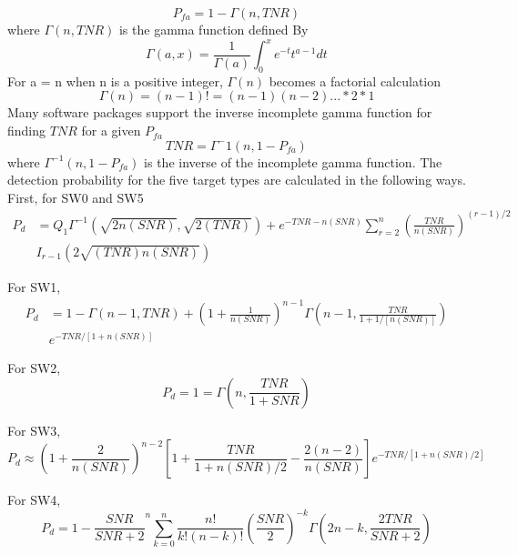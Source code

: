 \documentclass[12pt]{article}
\begin{document}
\begin{equation}
    P_{fa} = 1 - \Gamma(n, TNR)
\end{equation}
where $\Gamma(n,TNR)$ is the gamma function defined By
\begin{equation}
    \Gamma(a,x) = \frac{1}{\Gamma(a)} \int_{0}^{x}  e^{-t} t^{a-1} dt
\end{equation}
For a = n when n is a positive integer, $\Gamma(n)$ becomes a factorial calculation
\begin{equation}
    \Gamma(n) = (n-1)! = (n-1)(n-2) ... * 2 * 1
\end{equation}
Many software packages support the inverse incomplete gamma function for finding $TNR$ for a given $P_{fa}$
\begin{equation}
    TNR = \Gamma^-1 (n, 1-P_{fa})
\end{equation}
where $\Gamma^{-1}(n, 1-P_{fa})$ is the inverse of the incomplete gamma function. The detection probability for the five target types are calculated in the following ways. First, for SW0 and SW5
\begin{equation}
    \begin{split}
    P_d & = Q_1 \Gamma^{-1} \left( \sqrt{2n(SNR)}, \sqrt{2(TNR)} \right) + e^{-TNR-n(SNR)} \sum_{r=2}^{n} \left( \frac{TNR}{n(SNR)}\right)^{(r-1)/2} \\
    & I_{r-1} (2 \sqrt{(TNR)n(SNR)})
    \end{split}
\end{equation}

For SW1,
\begin{equation}
    \begin{split}
    P_d & = 1- \Gamma(n-1, TNR) + (1 + \frac{1}{n(SNR)})^{n-1} \Gamma \left( n-1, \frac{TNR}{1+1/\left[ n(SNR) \right]} \right) \\
    & e^{-TNR/\left[1+n(SNR)\right]}
    \end{split}
\end{equation}

For SW2,
\begin{equation}
    P_d = 1 = \Gamma\left(n, \frac{TNR}{1+SNR}\right)
\end{equation}

For SW3,
\begin{equation}
    P_d \approx \left(1+\frac{2}{n(SNR)}\right)^{n-2} \left[1+\frac{TNR}{1+n(SNR)/2}-\frac{2(n-2)}{n(SNR)}\right] e^{-TNR/\left[1+n(SNR)/2\right]}
\end{equation}

For SW4,
\begin{equation}
    P_d = 1 - \frac{SNR}{SNR+2}^n \sum_{k=0}^{n} \frac{n!}{k!(n-k)!} \left( \frac{SNR}{2} \right)^{-k} \Gamma\left( 2n-k, \frac{2TNR}{SNR+2}\right)
\end{equation}
\end{document}
